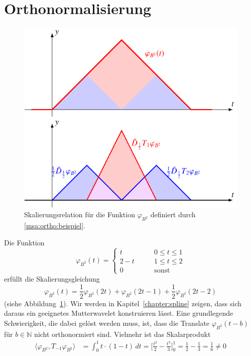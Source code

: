 %
%
%
\section{Orthonormalisierung
\label{section:orthonormalisierung}}
\begin{figure}
\centering
\includegraphics{chapters/6-msa/images/b2skal.pdf}
\caption{Skalierungsrelation für die Funktion $\varphi_{B^2}$
definiert durch \eqref{msa:ortho:beispiel}.
\label{msa:ortho:beispielfig}}
\end{figure}
Die Funktion
\begin{equation}
\varphi_{B^2}(t)
=
\begin{cases}
  t&\qquad 0\le t \le 1\\
2-t&\qquad 1\le t \le 2\\
  0&\qquad \text{sonst}
\end{cases}
\label{msa:ortho:beispiel}
\end{equation}
erfüllt die Skalierungsgleichung
\begin{equation}
\varphi_{B^2}(t)
= 
\frac12\varphi_{B^2}(2t)
+
\varphi_{B^2}(2t-1)
+
\frac12\varphi_{B^2}(2t-2)
\label{eq:skalierung-phi1-proto}
\end{equation}
(siehe Abbildung~\ref{msa:ortho:beispielfig}).
Wir werden in Kapitel~\ref{chapter:spline} zeigen, dass sich daraus ein
geeignetes Mutterwavelet konstruieren lässt.
Eine grundlegende Schwierigkeit, die dabei gelöst werden muss, ist, dass
die Translate $\varphi_{B^2}(t-b)$ für $b\in\mathbb N$ nicht orthonormiert
sind.
Vielmehr ist das Skalarprodukt
\begin{align*}
\langle \varphi_{B^2}, T_{-1}\varphi_{B^2}\rangle
&=
\int_0^1 t\cdot (1-t)\,dt
=
\biggl[
\frac{t^2}{2}-\frac{t^3}{3}
\biggl]_0^1
=
\frac12-\frac13 = \frac16\ne 0
\end{align*}

